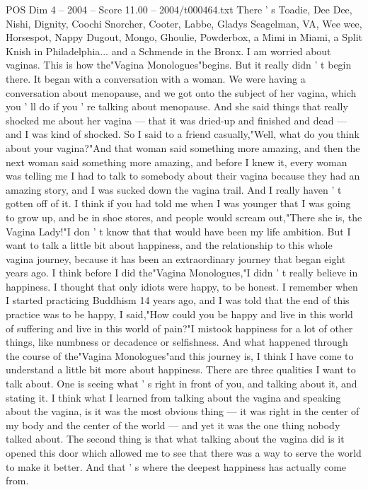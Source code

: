 \begin{textsample}{POS Dim 4 – 2004 – Score 11.00 – 2004/t000464.txt}
There ' s Toadie, Dee Dee, Nishi, Dignity, Coochi Snorcher, Cooter, Labbe, Gladys Seagelman, VA, Wee wee, Horsespot, Nappy Dugout, Mongo, Ghoulie, Powderbox, a Mimi in Miami, a Split Knish in Philadelphia... and a Schmende in the Bronx.
I am worried about vaginas.
This is how the"Vagina Monologues"begins.
But it really didn ' t begin there.
It began with a conversation with a woman.
We were having a conversation about menopause, and we got onto the subject of her vagina, which you ' ll do if you ' re talking about menopause.
And she said things that really shocked me about her vagina — that it was dried-up and finished and dead — and I was kind of shocked.
So I said to a friend casually,"Well, what do you think about your vagina?"And that woman said something more amazing, and then the next woman said something more amazing, and before I knew it, every woman was telling me I had to talk to somebody about their vagina because they had an amazing story, and I was sucked down the vagina trail.
And I really haven ' t gotten off of it.
I think if you had told me when I was younger that I was going to grow up, and be in shoe stores, and people would scream out,"There she is, the Vagina Lady!"I don ' t know that that would have been my life ambition.
But I want to talk a little bit about happiness, and the relationship to this whole vagina journey, because it has been an extraordinary journey that began eight years ago.
I think before I did the"Vagina Monologues,"I didn ' t really believe in happiness.
I thought that only idiots were happy, to be honest.
I remember when I started practicing Buddhism 14 years ago, and I was told that the end of this practice was to be happy, I said,"How could you be happy and live in this world of suffering and live in this world of pain?"I mistook happiness for a lot of other things, like numbness or decadence or selfishness.
And what happened through the course of the"Vagina Monologues"and this journey is, I think I have come to understand a little bit more about happiness.
There are three qualities I want to talk about.
One is seeing what ' s right in front of you, and talking about it, and stating it.
I think what I learned from talking about the vagina and speaking about the vagina, is it was the most obvious thing — it was right in the center of my body and the center of the world — and yet it was the one thing nobody talked about.
The second thing is that what talking about the vagina did is it opened this door which allowed me to see that there was a way to serve the world to make it better.
And that ' s where the deepest happiness has actually come from.

\end{textsample}
